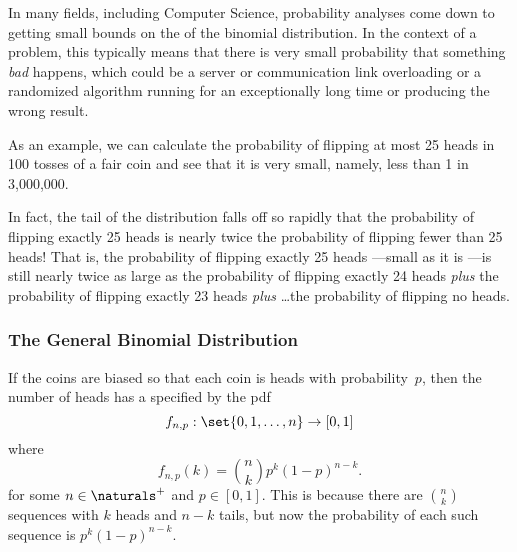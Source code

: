 \iffalse
The cumulative distribution function for the unbiased binomial
distribution is $F_n: \reals \to [0, 1]$ where
\begin{equation*}
F_n(x) =
    \begin{cases}
        0 & \text{if $x < 1$} \\
        \sum_{i = 0}^k \binom{n}{i} 2^{-n}
            & \text{if $k \le x < k + 1$ for $1 \le k < n$} \\
        1 & \text{if $n \le x$}.
    \end{cases}
\end{equation*}
\fi

In many fields, including Computer Science, probability analyses come down
to getting small bounds on the  of the binomial distribution.
In the context of a problem, this typically means that there is very small
probability that something \emph{bad} happens, which could be a server
or communication link overloading or a randomized algorithm running for an
exceptionally long time or producing the wrong result.

As an example, we can calculate the probability of flipping at most 25
heads in 100 tosses of a fair coin and see that it is very small, namely,
less than 1 in 3,000,000.

In fact, the tail of the distribution falls off so rapidly that the
probability of flipping exactly 25 heads is nearly twice the
probability of flipping fewer than 25 heads!  That is, the probability
of flipping exactly 25 heads ---small as it is ---is still nearly
twice as large as the probability of flipping exactly 24 heads
\emph{plus} the probability of flipping exactly 23 heads \emph{plus}
\dots the probability of flipping no heads.

\subsubsection{The General Binomial Distribution}

If the coins are biased so that each coin is heads with
probability~$p$, then the number of heads has a  specified by the pdf
\begin{equation*}
    f_{n,p} : \set{0, 1, \dots, n} \to [0, 1]
\end{equation*}
where
\[
    f_{n, p}(k) = \binom{n}{k} p^k (1-p)^{n-k}.
\]
for some $n \in \naturals^+$ and $p \in [0, 1]$.  This is because
there are $\binom{n}{k}$ sequences with $k$ heads and $n - k$ tails,
but now the probability of each such sequence is $p^k (1-p)^{n-k}$.

